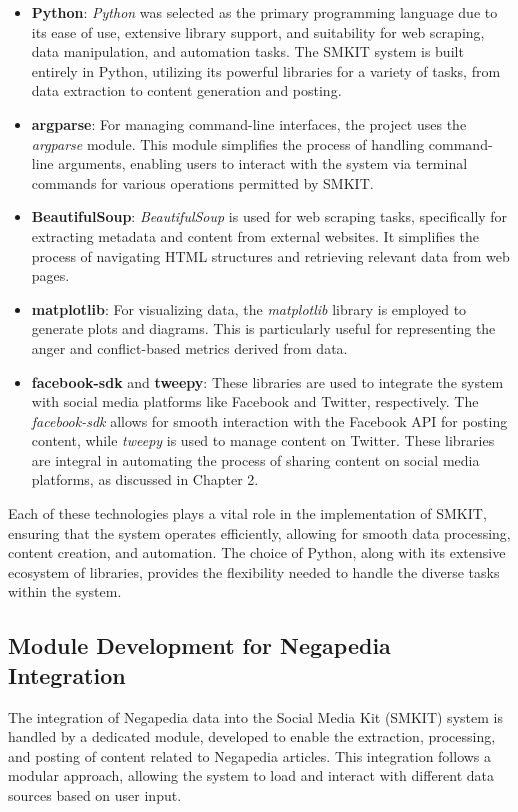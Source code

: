 \begin{itemize}
    \item \textbf{Python}: \textit{Python} was selected as the primary programming language due to its ease of use, extensive library support, and suitability for web scraping, data manipulation, and automation tasks. The SMKIT system is built entirely in Python, utilizing its powerful libraries for a variety of tasks, from data extraction to content generation and posting.
    
    \item \textbf{argparse}: For managing command-line interfaces, the project uses the \textit{argparse} module. This module simplifies the process of handling command-line arguments, enabling users to interact with the system via terminal commands for various operations permitted by SMKIT.

    \item \textbf{BeautifulSoup}: \textit{BeautifulSoup} is used for web scraping tasks, specifically for extracting metadata and content from external websites. It simplifies the process of navigating HTML structures and retrieving relevant data from web pages.

    \item \textbf{matplotlib}: For visualizing data, the \textit{matplotlib} library is employed to generate plots and diagrams. This is particularly useful for representing the anger and conflict-based metrics derived from data.
    
    \item \textbf{facebook-sdk} and \textbf{tweepy}: These libraries are used to integrate the system with social media platforms like Facebook and Twitter, respectively. The \textit{facebook-sdk} allows for smooth interaction with the Facebook API for posting content, while \textit{tweepy} is used to manage content on Twitter. These libraries are integral in automating the process of sharing content on social media platforms, as discussed in Chapter 2.

\end{itemize}

Each of these technologies plays a vital role in the implementation of SMKIT, ensuring that the system operates efficiently, allowing for smooth data processing, content creation, and automation. The choice of Python, along with its extensive ecosystem of libraries, provides the flexibility needed to handle the diverse tasks within the system.

\subsection{Module Development for Negapedia Integration}
\label{subsec:module_development_negapedia}
The integration of Negapedia data into the Social Media Kit (SMKIT) system is handled by a dedicated module, developed to enable the extraction, processing, and posting of content related to Negapedia articles. This integration follows a modular approach, allowing the system to load and interact with different data sources based on user input.

